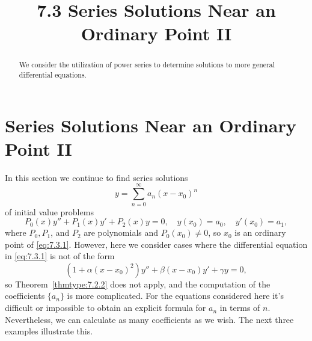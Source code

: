 \documentclass{ximera}
\title{7.3 Series Solutions Near an Ordinary Point II}%
\begin{document}
\begin{abstract}
We consider the utilization of power series to determine solutions to more general differential equations.
\end{abstract}

\maketitle

\section*{Series Solutions Near an Ordinary Point II}

In this section we continue to find series solutions
$$
y=\sum_{n=0}^\infty a_n(x-x_0)^n
$$
of initial value problems
\begin{equation} \label{eq:7.3.1}
P_0(x)y''+P_1(x)y'+P_2(x)y=0,\quad y(x_0)=a_0,\quad y'(x_0)=a_1,
\end{equation}
where $P_0,P_1$, and $P_2$ are polynomials and $P_0(x_0)\neq0$,
so $x_0$ is an ordinary point of \eqref{eq:7.3.1}.  However, here we
consider cases where the differential equation in \eqref{eq:7.3.1}
is not of the form
$$
\left(1+\alpha(x-x_0)^2\right)y''+\beta(x-x_0) y'+\gamma y=0,
$$
so Theorem~\ref{thmtype:7.2.2} does not apply, and the computation of the
coefficients $\{a_n\}$ is more complicated. For the equations
considered here it's difficult or impossible to obtain an explicit
formula for $a_n$ in terms of $n$. Nevertheless, we can calculate as
many coefficients as we wish. The next three examples illustrate
this.
\end{document}
